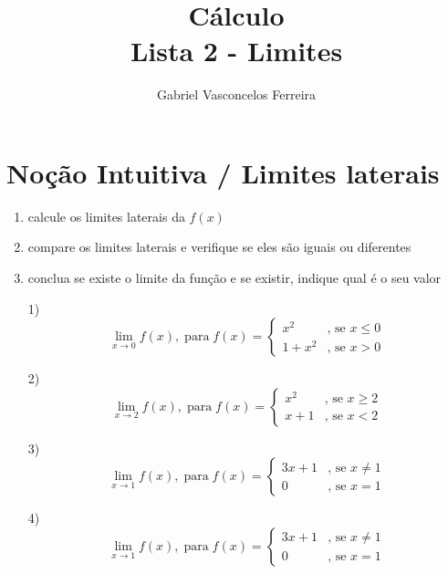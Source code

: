 \documentclass{jhwhw}
\title{Cálculo\\Lista 2 - Limites}
\author{Gabriel Vasconcelos Ferreira}
\begin{document}
\maketitle
\chapter{Noção Intuitiva / Limites laterais}
\begin{enumerate}
    \item calcule os limites laterais da $f(x)$
    \item compare os limites laterais e verifique se eles são iguais ou diferentes
    \item conclua se existe o limite da função e se existir, indique qual é o seu valor
\end{enumerate}
\begin{enumerate}
    \item [1)]$$
              \lim _{x \to 0} f(x), \operatorname{para} f(x)= \begin{cases}
                  x^2 & \text {, se } x \leq 0 \\ 1+x^2 & \text {, se } x>0
              \end{cases}$$
    \item [2)]$$
              \lim _{x \to 2} f(x), \operatorname{para} f(x)= \begin{cases}
                  x^2 & \text {, se } x \geq 2 \\ x+1 & \text {, se } x<2
              \end{cases}
          $$
    \item [3)]$$
              \lim _{x \to 1} f(x), \operatorname{para} f(x)= \begin{cases}
                  3x+1 & \text {, se } x \neq 1 \\ 0 & \text {, se } x=1
              \end{cases}
          $$
    \item [4)]$$
              \lim _{x \to 1} f(x), \operatorname{para} f(x)= \begin{cases}
                  3x+1 & \text {, se } x \neq 1 \\ 0 & \text {, se } x=1
              \end{cases}
          $$
\end{enumerate}
\newpage
{}
\end{document}
